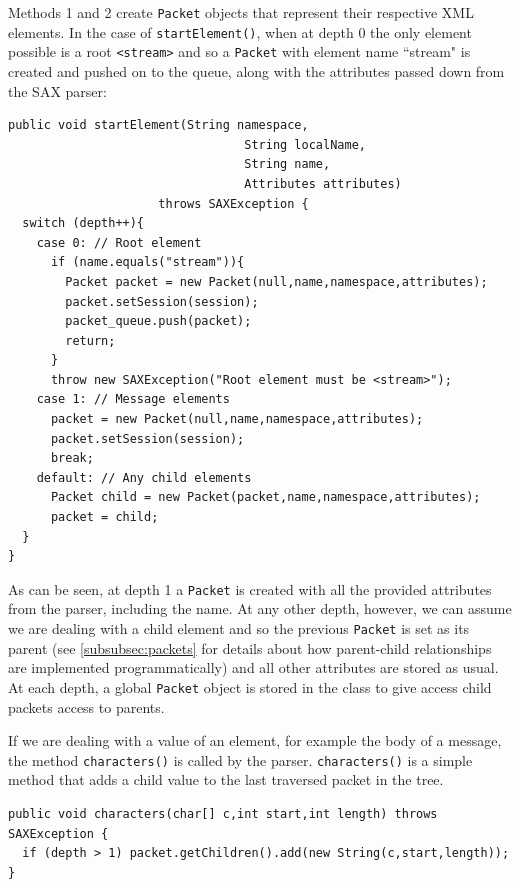     Methods 1 and 2 create \verb!Packet! objects that represent their respective XML elements. In the case of \verb!startElement()!, when at depth 0 the only element possible is a root \verb!<stream>! and so a \verb!Packet! with element name ``stream" is created and pushed on to the queue, along with the attributes passed down from the SAX parser: \\
    
    \begin{lstlisting}
public void startElement(String namespace,
                                 String localName,
                                 String name,
                                 Attributes attributes)
                     throws SAXException {
  switch (depth++){
    case 0: // Root element
      if (name.equals("stream")){
        Packet packet = new Packet(null,name,namespace,attributes);
        packet.setSession(session);
        packet_queue.push(packet);
        return;
      }
      throw new SAXException("Root element must be <stream>");
    case 1: // Message elements
      packet = new Packet(null,name,namespace,attributes);
      packet.setSession(session);
      break;
    default: // Any child elements
      Packet child = new Packet(packet,name,namespace,attributes);
      packet = child;
  }
}
    \end{lstlisting}
    
    As can be seen, at depth 1 a \verb!Packet! is created with all the provided attributes from the parser, including the name. At any other depth, however, we can assume we are dealing with a child element and so the previous \verb!Packet! is set as its parent (see \textsection\ref{subsubsec:packets} for details about how parent-child relationships are implemented programmatically) and all other attributes are stored as usual. At each depth, a global \verb!Packet! object is stored in the class to give access child packets access to parents.
    
    If we are dealing with a value of an element, for example the body of a message, the method \verb!characters()! is called by the parser. \verb!characters()! is a simple method that adds a child value to the last traversed packet in the tree. \\
    
    \begin{lstlisting}
public void characters(char[] c,int start,int length) throws SAXException {
  if (depth > 1) packet.getChildren().add(new String(c,start,length));
}
    \end{lstlisting}
    
